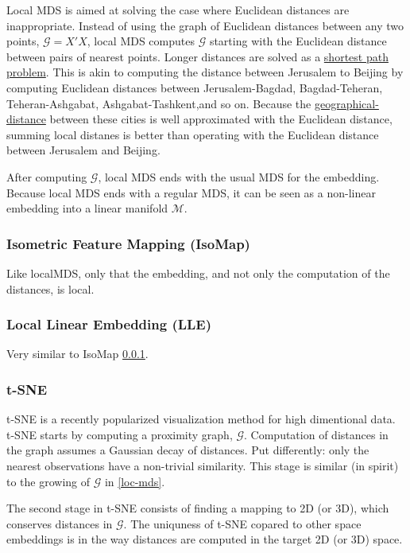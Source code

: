 \documentclass[]{book}
\theoremstyle{definition}
\theoremstyle{definition}
\theoremstyle{definition}
\theoremstyle{remark}
\begin{document}
Local MDS is aimed at solving the case where Euclidean distances are
inappropriate. Instead of using the graph of Euclidean distances between
any two points, \(\mathcal{G}=X'X\), local MDS computes \(\mathcal{G}\)
starting with the Euclidean distance between pairs of nearest points.
Longer distances are solved as a
\href{https://en.wikipedia.org/wiki/Shortest_path_problem}{shortest path
problem}. This is akin to computing the distance between Jerusalem to
Beijing by computing Euclidean distances between Jerusalem-Bagdad,
Bagdad-Teheran, Teheran-Ashgabat, Ashgabat-Tashkent,and so on. Because
the
\href{https://en.wikipedia.org/wiki/Geographical_distance}{geographical-distance}
between these cities is well approximated with the Euclidean distance,
summing local distanes is better than operating with the Euclidean
distance between Jerusalem and Beijing.

After computing \(\mathcal{G}\), local MDS ends with the usual MDS for
the embedding. Because local MDS ends with a regular MDS, it can be seen
as a non-linear embedding into a linear manifold \(\mathcal{M}\).

\subsubsection{Isometric Feature Mapping (IsoMap)}\label{isomap}

Like localMDS, only that the embedding, and not only the computation of
the distances, is local.

\subsubsection{Local Linear Embedding
(LLE)}\label{local-linear-embedding-lle}

Very similar to IsoMap \ref{isomap}.

\subsubsection{t-SNE}\label{t-sne}

t-SNE is a recently popularized visualization method for high
dimentional data. t-SNE starts by computing a proximity graph,
\(\mathcal{G}\). Computation of distances in the graph assumes a
Gaussian decay of distances. Put differently: only the nearest
observations have a non-trivial similarity. This stage is similar (in
spirit) to the growing of \(\mathcal{G}\) in \ref{loc-mds}.

The second stage in t-SNE consists of finding a mapping to 2D (or 3D),
which conserves distances in \(\mathcal{G}\). The uniquness of t-SNE
copared to other space embeddings is in the way distances are computed
in the target 2D (or 3D) space.
\end{document}
